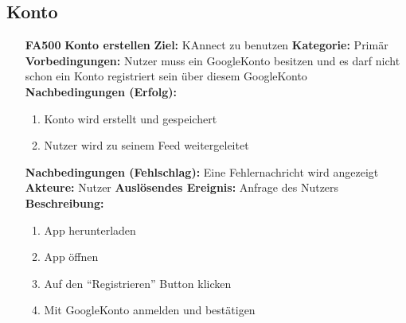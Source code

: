 \documentclass[parskip=full]{scrartcl}
\begin{document}
		\subsection{Konto} \label{sec:FAKonto}
		\begin{itemize}[nosep]
			
			\item[\textbf{FA500}]\textbf{Konto erstellen}
			\newline \textbf{Ziel:} KAnnect zu benutzen
			\newline \textbf{Kategorie:} Primär
			\newline \textbf{Vorbedingungen:} Nutzer muss ein \gls{GoogleKonto} besitzen und es darf nicht schon ein Konto registriert sein über diesem \gls{GoogleKonto}
			\newline \textbf{Nachbedingungen (Erfolg):} 
			\begin{enumerate}[nosep]
				\item Konto wird erstellt und gespeichert
				\item Nutzer wird zu seinem \gls{Feed} weitergeleitet 
			\end{enumerate}
			\textbf{Nachbedingungen (Fehlschlag):} Eine Fehlernachricht wird angezeigt
			\newline \textbf{Akteure:} Nutzer
			\newline \textbf{Auslösendes Ereignis:} Anfrage des Nutzers
			\newline \textbf{Beschreibung:}
			\begin{enumerate}[nosep]
				\item \gls{App} herunterladen
				\item \gls{App} öffnen
				\item Auf den “Registrieren” \gls{Button} klicken
				\item Mit \gls{GoogleKonto} anmelden und bestätigen\\
			\end{enumerate}
			

\end{itemize}
\end{document}
